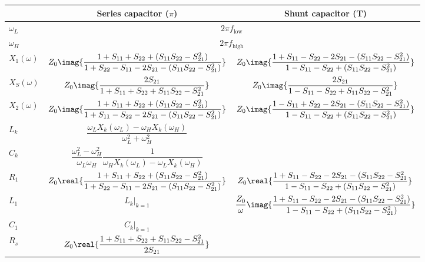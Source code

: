 \def\TabSpace{\rule{0pt}{4.5ex} \rule[-3ex]{0pt}{0pt}}
\begin{table}
    \centering
    \begin{tabular}{|l|c|c|}
        \hline
        & Series capacitor ($\pi$) & Shunt capacitor (T) \\
        \hline
        \TabSpace$\omega_L$  & \multicolumn{2}{c|}{$2\pi f_{\text{low}}$} \\
        \TabSpace$\omega_H$  & \multicolumn{2}{c|}{$2\pi f_{\text{high}}$} \\
        \hline
        \TabSpace$X_1(\omega)$ 
        & $Z_0\imag{\dfrac{1+S_{11}+S_{22}+(S_{11}S_{22}-S_{21}^2)}{1+S_{22}-S_{11}-2S_{21}-(S_{11}S_{22}-S_{21}^2)}}$ 
        & $Z_0 \imag{\dfrac{1+S_{11}-S_{22}-2S_{21}-(S_{11}S_{22}-S_{21}^2)}{1-S_{11}-S_{22}+(S_{11}S_{22}-S_{21}^2)}}$\\
        \TabSpace$X_S(\omega)$ 
        & $Z_0 \imag{\dfrac{2S_{21}}{1+S_{11}+S_{22}+S_{11}S_{22}-S_{21}^2}}$ 
        & $Z_0 \imag{\dfrac{2S_{21}}{1-S_{11}-S_{22}+S_{11}S_{22}-S_{21}^2}}$\\
        \TabSpace$X_2(\omega)$ 
        & $Z_0 \imag{\dfrac{1 + S_{11} + S_{22} + (S_{11}S_{22}-S_{21}^2)}{1 + S_{11} - S_{22} - 2S_{21} - (S_{11}S_{22} - S_{21}^2)}}$ 
        & $Z_0 \imag{\dfrac{1-S_{11}+S_{22}-2S_{21}-(S_{11}S_{22}-S_{21}^2)}{1-S_{11}-S_{22}+(S_{11}S_{22}-S_{21}^2)}}$\\
        \hline
        \TabSpace$L_k$ 
        & $\dfrac{\omega_LX_k(\omega_L) - \omega_HX_k(\omega_H)}{\omega_L^2+\omega_H^2}$
        &  \\
        \TabSpace$C_k$ 
        & $\dfrac{\omega_L^2-\omega_H^2}{\omega_L\omega_H} \dfrac{1}{\omega_HX_k(\omega_L) - \omega_LX_k(\omega_H)}$
        &  \\
        \hline
        \TabSpace$R_1$ 
        & $Z_0 \real{\dfrac{1+S_{11}+S_{22}+(S_{11}S_{22}-S_{21}^2)}{1+S_{22}-S_{11}-2S_{21}-(S_{11}S_{22}-S_{21}^2)}}$ 
        & $Z_0 \real{\dfrac{1+S_{11}-S_{22}-2S_{21}-(S_{11}S_{22}-S_{21}^2}{1-S_{11}-S_{22}+(S_{11}S_{22}-S_{21}^2)}}$\\
        \TabSpace$L_1$ 
        & $L_k\Big|_{k=1}$ 
        & $\dfrac{Z_0}{\omega} \imag{\dfrac{1+S_{11}-S_{22}-2S_{21}-(S_{11}S_{22}-S_{21}^2)}{1-S_{11}-S_{22}+(S_{11}S_{22}-S_{21}^2)}}$\\
        \TabSpace$C_1$ 
        & $C_k\Big|_{k=1}$ 
        & \\
        \hline
        \TabSpace$R_s$ 
        & $Z_0 \real{\dfrac{1+S_{11}+S_{22}+S_{11}S_{22}-S_{21}^2}{2S_{21}}}$ 

\end{tabular}
\end{table}

